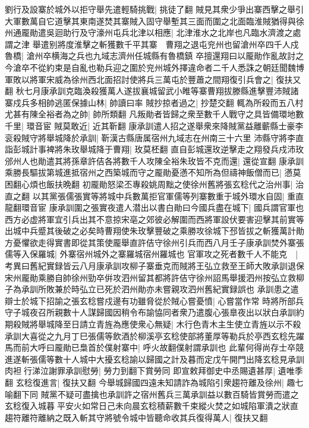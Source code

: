 劉行及設寨於城外以拒守舉先遣輕騎挑戰|{
	挑徒了翻}
賊見其衆少爭出寨西擊之舉引大軍數萬自它道擊其東南遂焚其寨賊入固守舉塹其三面而圍之北面臨淮賊猶得與徐州通龎勛遣吳迴助行及守濠州屯兵北津以相應|{
	北津淮水之北岸也凡臨水濟渡之處謂之津}
舉遣别將度淮擊之斬獲數千平其寨　曹翔之退屯兖州也留滄州卒四千人戍魯橋|{
	滄州卒横海之兵也九域志濟州任城縣有魯橋鎮}
卒擅還翔曰以龎勛作亂故討之今滄卒不從約束是自亂也勒兵迎之圍於兖州城外擇違命者二千人悉誅之朝廷聞魏博軍敗以將軍宋威為徐州西北面招討使將兵三萬屯於豐蕭之間翔復引兵會之|{
	復扶又翻}
秋七月康承訓克臨渙殺獲萬人遂拔襄城留武小睢等寨曹翔拔滕縣進擊豐沛賊諸寨戍兵多相帥逃匿保據山林|{
	帥讀曰率}
賊抄掠者過之|{
	抄楚交翻}
輒為所殺而五八村尤甚有陳全裕者為之帥|{
	帥所類翻}
凡叛勛者皆歸之衆至數千人戰守之具皆備環地數千里|{
	環音宦}
賊莫敢近|{
	近其靳翻}
康承訓遣人招之遂舉衆來降賊黨益離蘄縣士豪李衮殺賊守將舉城降於承訓|{
	靳漢古縣唐属宿州九域志在州南三十六里}
沛縣守將李直詣彭城計事裨將朱玫舉城降于曹翔|{
	玫莫柸翻}
直自彭城還玫逆擊走之翔發兵戍沛玫邠州人也勛遣其將孫章許佶各將數千人攻陳全裕朱玫皆不克而還|{
	還從宣翻}
康承訓乘勝長驅拔第城進抵宿州之西築城而守之龎勛憂懣不知所為但禱神飯僧而已|{
	懣莫困翻心煩也飯扶晩翻}
初龎勛怒梁丕專殺姚周黜之使徐州舊將張玄稔代之治州事|{
	治直之翻}
以其黨張儒張實等將城中兵數萬拒官軍儒等列寨數重于城外環水自固|{
	重直龍翻環音宦}
康承訓圍之張實夜遣人潜出以書白勛曰今國兵盡在城下|{
	國兵謂官軍也}
西方必虚將軍宜引兵出其不意掠宋亳之郊彼必解圍而西將軍設伏要害迎擊其前實等出城中兵蹙其後破之必矣時曹翔使朱玫擊豐破之乘勝攻徐城下邳皆拔之斬獲萬計勛方憂懼欲走得實書即從其策使龎舉直許佶守徐州引兵而西八月壬子康承訓焚外寨張儒等入保羅城|{
	外寨宿州城外之寨羅城宿州羅城也}
官軍攻之死者數千人不能克　|{
	考異曰舊紀實録皆云八月康承訓攻柳子寨垂克而賊將王弘立救至王師大敗承訓退保宋州龎勛乘勝自帥徐州勁卒倂攻泗州留其都將許佶守徐州詔馬舉援泗州按弘立救柳子為承訓所敗兼於時弘立已死於泗州勛亦未嘗親攻泗州舊紀實録誤也}
承訓患之遣辯士於城下招諭之張玄稔嘗戍邊有功雖脅從於賊心嘗憂憤|{
	心嘗當作常}
時將所部兵守子城夜召所親數十人謀歸國因稍令布諭恊同者衆乃遣腹心張臯夜出以狀白承訓約期殺賊將舉城降至日請立青旌為應使衆心無疑|{
	木行色青木主生使立青旌以示不殺}
承訓大喜從之九月丁巳張儒等飲酒於柳溪亭玄稔使部將董厚等勒兵於亭西玄稔先躍馬而前大呼曰龎勛已梟首於僕射寨中|{
	呼火故翻僕射謂承訓也}
此輩何得尚存士卒競進遂斬張儒等數十人城中大擾玄稔諭以歸國之計及暮而定戊午開門出降玄稔見承訓肉袒行涕泣謝罪承訓慰勞|{
	勞力到翻下賞勞同}
即宣敕拜御史中丞賜遺甚厚|{
	遺唯季翻}
玄稔復進言|{
	復扶又翻}
今舉城歸國四遠未知請詐為城陷引衆趨符離及徐州|{
	趣七喻翻下同}
賊黨不疑可盡擒也承訓許之宿州舊兵三萬承訓益以數百騎皆賞勞而遣之玄稔復入城暮平安火如常日己未向晨玄稔積薪數千束縱火焚之如城陷軍潰之狀直趨符離符離納之既入斬其守將號令城中皆聽命收其兵復得萬人|{
	復扶又翻}

